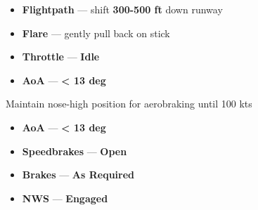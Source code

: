 \begin{checklistenumerate}[resume]
    \begin{itemize}
        \item \textbf{Flightpath} --- shift \textbf{300-500 ft} down runway
        \item \textbf{Flare} --- gently pull back on stick
        \item \textbf{Throttle} --- \textbf{Idle}
        \item \textbf{AoA} --- \textbf{< 13 deg}
    \end{itemize}
    \blueitem[Touchdown]
     Maintain nose-high position for aerobraking until 100 kts
    \begin{itemize}
        \item \textbf{AoA} --- \textbf{< 13 deg}
        \item \textbf{Speedbrakes} --- \textbf{Open}
        \item \textbf{Brakes} --- \textbf{As Required}
    \end{itemize}
    \blueitem[Taxi]
    \begin{itemize}
        \item \textbf{NWS} --- \textbf{Engaged}
    \end{itemize}
\end{checklistenumerate}

\clearpage

